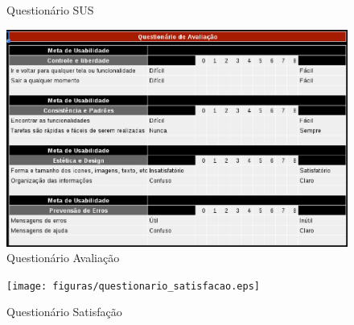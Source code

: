 \begin{apendicesenv}
\begin{figure}[h]
	\caption{Questionário SUS}
\end{figure}
\begin{figure}[h]
	\centering
	\includegraphics[scale=0.5]{figuras/questionario_avaliacao.eps}
	\caption{Questionário Avaliação}
\end{figure}
\begin{figure}[h]
	\centering
	\texttt{[image: figuras/questionario\_satisfacao.eps]}
	\caption{Questionário Satisfação}
\end{figure}
\begin{figure}[h]
	\centering

\end{figure}
\end{apendicesenv}
